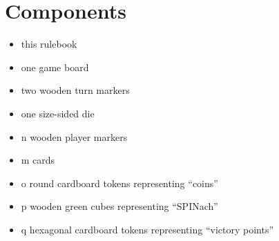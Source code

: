 \chapter{Components}
\begin{itemize}
	\item this rulebook
	\item one game board
	\item two wooden turn markers
	\item one size-sided die
	\item n wooden player markers %
	\item m cards %
	\item o round cardboard tokens representing ``coins''
	\item p wooden green cubes representing ``SPINach''
	\item q hexagonal cardboard tokens representing ``victory points''
\end{itemize}